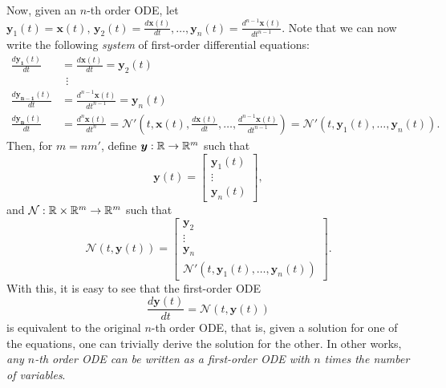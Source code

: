 Now, given an $n$-th order \gls{ODE}, let $\bm{y}_1\left( t \right) =\bm{x}\left( t \right),\,\bm{y}_2\left( t \right) = \frac{d \bm{x}\left( t \right) }{d t} ,\ldots, \bm{y}_n\left( t \right) = \frac{d^{n-1} \bm{x}\left( t \right) }{d t^{n-1}}$.
Note that we can now write the following \emph{system} of first-order differential equations:
\begin{align*}
    \frac{d \bm{y_1}\left( t \right) }{dt} &= \frac{d \bm{x}\left( t \right) }{d t} = \bm{y}_2\left( t \right) \\
    &~~\vdots \\
    \frac{d \bm{y_{n-1}}\left( t \right) }{dt} &= \frac{d^{n-1} \bm{x}\left( t \right) }{d t^{n-1}} = \bm{y}_n\left( t \right) \\
    \frac{d \bm{y_n}\left( t \right) }{dt} &= \frac{d^{n} \bm{x}\left( t \right) }{d t^{n}} = \mathcal{N}'\left( t, \bm{x}\left( t \right), \frac{d \bm{x}(t)}{d t}, \ldots,\frac{d^{n-1}\bm{x}(t)}{d t^{n-1}} \right) = \mathcal{N}'\left( t, \bm{y}_1\left( t \right), \ldots, \bm{y}_n\left( t \right) \right)
.\end{align*}
Then, for $m=n m'$, define $\bm{y}:\mathbb{R}\to \mathbb{R}^{m}$ such that \[
\bm{y}\left( t \right)  = \begin{bmatrix} 
\bm{y}_1\left( t \right) \\ \vdots \\ \bm{y}_n\left( t \right) 
\end{bmatrix} 
,\] and $\mathcal{N}:\mathbb{R}\times \mathbb{R}^{m}\to \mathbb{R}^{m}$ such that \[
    \mathcal{N}\left( t,\bm{y}\left( t \right)  \right) = \begin{bmatrix} 
    \bm{y}_2 \\ \vdots \\ \bm{y}_n \\ \mathcal{N}'\left( t, \bm{y}_1\left( t \right), \ldots, \bm{y}_n\left( t \right) \right)
    \end{bmatrix} 
.\] With this, it is easy to see that the first-order \gls{ODE}
\begin{equation}\label{eq:ode}
    \frac{d \bm{y}\left( t \right) }{d t} = \mathcal{N}\left( t, \bm{y}\left( t \right)  \right) 
\end{equation}
is equivalent to the original $n$-th order \gls{ODE}, that is, given a solution for one of the equations, one can trivially derive the solution for the other.
In other works, \emph{any $n$-th order \gls{ODE} can be written as a first-order \gls{ODE} with $n$ times the number of variables}.

